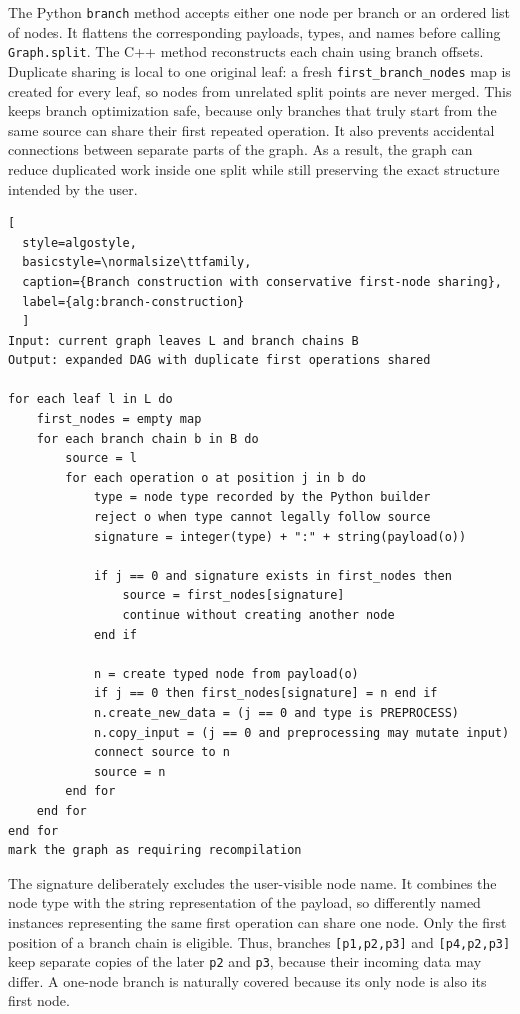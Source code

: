 The Python \texttt{branch} method accepts either one node per branch or an
ordered list of nodes. It flattens the corresponding payloads, types, and names
before calling \texttt{Graph.split}. The C++ method reconstructs each chain using
branch offsets. Duplicate sharing is local to one original leaf: a fresh
\texttt{first\_branch\_nodes} map is created for every leaf, so nodes from
unrelated split points are never merged. This keeps branch optimization safe,
because only branches that truly start from the same source can share their
first repeated operation. It also prevents accidental connections between
separate parts of the graph. As a result, the graph can reduce duplicated work
inside one split while still preserving the exact structure intended by the
user.

\newpage
\begin{lstlisting}[
  style=algostyle,
  basicstyle=\normalsize\ttfamily,
  caption={Branch construction with conservative first-node sharing},
  label={alg:branch-construction}
  ]
Input: current graph leaves L and branch chains B
Output: expanded DAG with duplicate first operations shared

for each leaf l in L do
    first_nodes = empty map
    for each branch chain b in B do
        source = l
        for each operation o at position j in b do
            type = node type recorded by the Python builder
            reject o when type cannot legally follow source
            signature = integer(type) + ":" + string(payload(o))

            if j == 0 and signature exists in first_nodes then
                source = first_nodes[signature]
                continue without creating another node
            end if

            n = create typed node from payload(o)
            if j == 0 then first_nodes[signature] = n end if
            n.create_new_data = (j == 0 and type is PREPROCESS)
            n.copy_input = (j == 0 and preprocessing may mutate input)
            connect source to n
            source = n
        end for
    end for
end for
mark the graph as requiring recompilation
\end{lstlisting}

The signature deliberately excludes the user-visible node name. It combines the
node type with the string representation of the payload, so differently named
instances representing the same first operation can share one node. Only the
first position of a branch chain is eligible. Thus, branches
\texttt{[p1,p2,p3]} and \texttt{[p4,p2,p3]} keep separate copies of the later
\texttt{p2} and \texttt{p3}, because their incoming data may differ. A one-node
branch is naturally covered because its only node is also its first node.

